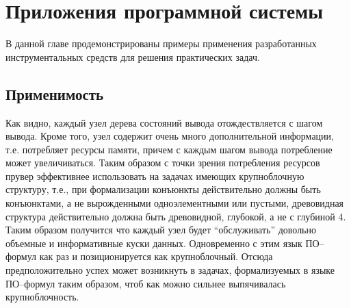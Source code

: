 \chapter{Приложения программной системы}
\label{part:examples}

В данной главе продемонстрированы примеры применения разработанных инструментальных средств  для решения практических задач. %

\section{Применимость}
Как видно, каждый узел дерева состояний вывода отождествляется с шагом вывода. Кроме того, узел содержит очень много дополнительной информации, т.е. потребляет ресурсы памяти, причем с каждым шагом вывода потребление может увеличиваться. Таким образом с точки зрения потребления ресурсов прувер эффективнее использовать на задачах имеющих крупноблочную структуру, т.е., при формализации конъюнкты действительно должны быть конъюнктами, а не вырожденными одноэлементными или пустыми, древовидная структура действительно должна быть древовидной, глубокой, а не с глубиной 4. Таким образом получится что каждый узел будет “обслуживать” довольно объемные и информативные куски данных. Одновременно с этим язык ПО--формул как раз и позиционируется как крупноблочный. Отсюда предположительно успех может возникнуть в задачах, формализуемых в языке ПО--формул таким образом, чтоб как можно сильнее выпячивалась крупноблочность. %


